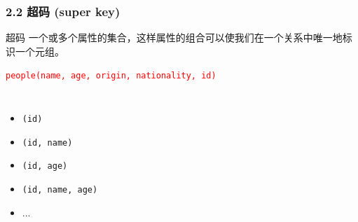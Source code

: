 \documentclass[aspectratio=169, 14pt]{beamer}
\begin{document}
\begin{frame}
	\frametitle{2.2 超码 (super key)}
	\begin{exampleblock}{超码}
		一个或多个属性的集合，这样属性的组合可以使我们在一个关系中唯一地标识一个元组。
	\end{exampleblock}
	\textcolor{red}{\texttt{people(name, age, origin, nationality, id)}}
	\pause
	\begin{columns}
		\begin{itemize}
			\item \texttt{(id)}
			\item \texttt{(id, name)}
			\item \texttt{(id, age)}
			\item \texttt{(id, name, age)}
			\item ...
		\end{itemize}
	\end{columns}
\end{frame}
\end{document}
